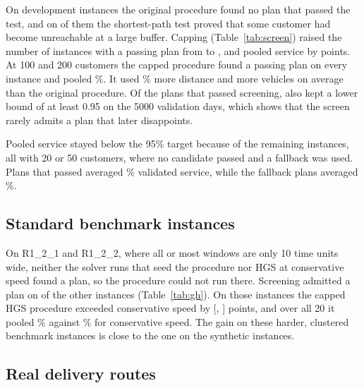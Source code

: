 \documentclass[12pt,letterpaper]{article}
\begin{document}
On \FailureCount{} development instances the original procedure found no plan that
passed the test, and on \CertifiedFailures{} of them the shortest-path test proved
that some customer had become unreachable at a large buffer. Capping
(Table~\ref{tab:screen}) raised the number of instances with a passing plan from
\OriginalSelected{} to \CappedSelected{}, and pooled service by
\CappedGainInterval{} points. At 100 and 200 customers the capped procedure found a
passing plan on every instance and pooled \CappedLargeRange\%. It used
\CappedDistanceCost\% more distance and \CappedFleetCost{} more vehicles on average
than the original procedure. Of the \CappedSelected{} plans that passed screening,
\CappedRetained{} also kept a lower bound of at least 0.95 on the 5000 validation
days, which shows that the screen rarely admits a plan that later disappoints.



Pooled service stayed below the 95\% target because of the remaining instances,
all with 20 or 50 customers, where no candidate passed and a fallback was used.
Plans that passed averaged \CappedSelectedMean\% validated service, while the
\CappedFallbackCount{} fallback plans averaged \CappedFallbackMean\%.

\subsection{Standard benchmark instances}

On R1\_2\_1 and R1\_2\_2, where all or most windows are only 10 time units wide,
neither the solver runs that seed the procedure nor HGS at conservative speed found a
plan, so the procedure could not run there. Screening admitted a plan on
\GhAdmitted{} of the other \GhAttempted{} instances (Table~\ref{tab:gh}). On those
\GhAttempted{} instances the capped HGS procedure exceeded conservative speed by
\GhDiff{} [\GhDiffLo, \GhDiffHi] points, and over all 20 it pooled \GhCapped\%
against \GhCons\% for conservative speed. The gain on these harder, clustered
benchmark instances is close to the one on the synthetic instances.



\subsection{Real delivery routes}
\end{document}
